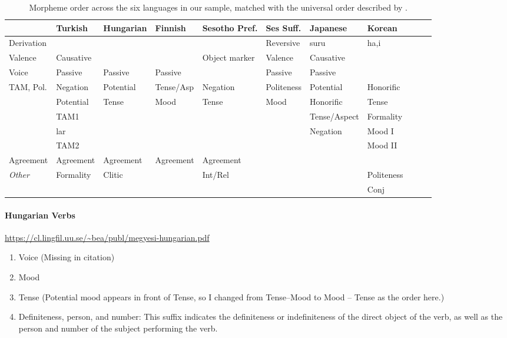 \documentclass[11pt,letterpaper]{article}
\newcommand\mhahn[1]{{\color{red}(#1)}}
\newcommand\becky[1]{{\color{blue}(#1)}}
\begin{document}
\begin{table}[]
    \centering
\begin{tabular}{l||l|l|l|l|l|l|llll}
                    & Turkish & Hungarian & Finnish  & Sesotho Pref.     & Ses Suff. & Japanese & Korean\\ \hline\hline
Derivation          &  &         &          &               & Reversive & suru    & ha,i\\ \hline
Valence             &  Causative &         &           & Object marker & Valence & Causative\\ \hline
Voice               & Passive & Passive    & Passive     &               & Passive & Passive\\ \hline
TAM, Pol.           & Negation  &   Potential  &   Tense/Asp &    Negation &  Politeness &      Potential        & Honorific \\
                    & Potential & Tense        &    Mood     &     Tense   &    Mood     &   Honorific  &    Tense       \\
                    &   TAM1    &          &                &         &                  & Tense/Aspect & Formality \\
                    & lar       &          &           &  & & Negation & Mood I\\
                    & TAM2         &           &               &          &       &      &  Mood II \\ \hline
Agreement           & Agreement & Agreement & Agreement & Agreement \\ \hline
\textit{Other}               & Formality          & Clitic    &              & Int/Rel &      &        & Politeness \\
                    &           &     &              &  &          &    & Conj \\
\end{tabular}
    \caption{Morpheme order across the six languages in our sample, matched with the universal order described by \cite{bybee-morphology-1985}.}
    \label{tab:table-orders}
\end{table}



\paragraph{Hungarian Verbs} \url{https://cl.lingfil.uu.se/~bea/publ/megyesi-hungarian.pdf}
\begin{enumerate}
    \item Voice \becky{Missing in citation}
    \item Mood
    \item Tense \mhahn{Potential mood appears in front of Tense, so I changed from Tense--Mood to Mood -- Tense as the order here.}
    \item Definiteness, person, and number: This suffix indicates the definiteness or indefiniteness of the direct object of the verb, as well as the person and number of the subject performing the verb. 
\end{enumerate}
\end{document}
